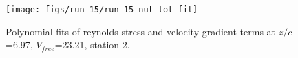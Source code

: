 \begin{figure}[H]
\centering
\texttt{[image: figs/run\_15/run\_15\_nut\_tot\_fit]}
\caption{Polynomial fits of reynolds stress and velocity gradient terms at $z/c$=6.97, $V_{free}$=23.21, station 2.}
\label{fig:run_15_nut_tot_fit}
\end{figure}


